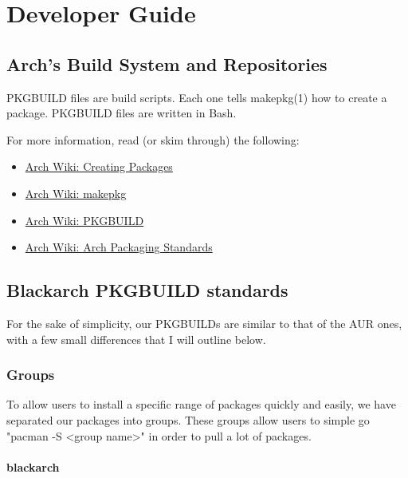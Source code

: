 \documentclass[a4paper, oneside, 11pt]{book}
\begin{document}

\chapter{Developer Guide}

\section{Arch's Build System and Repositories}

PKGBUILD files are build scripts. Each one tells makepkg(1) how to create a package. PKGBUILD files
are written in Bash.

For more information, read (or skim through) the following:
\begin{itemize}
	\item \href{https://wiki.archlinux.org/index.php/Creating_Packages}{Arch Wiki: Creating Packages}
	\item \href{https://wiki.archlinux.org/index.php/Makepkg}{Arch Wiki: makepkg}
	\item \href{https://wiki.archlinux.org/index.php/PKGBUILD}{Arch Wiki: PKGBUILD}
	\item \href{https://wiki.archlinux.org/index.php/Arch_Packaging_Standards}{Arch Wiki: Arch Packaging Standards}
\end{itemize}

\section{Blackarch PKGBUILD standards}

For the sake of simplicity, our PKGBUILDs are similar to that of the AUR ones, with a few small differences that I will outline below.

\subsection{Groups}

To allow users to install a specific range of packages quickly and easily, we have separated our packages into groups. These groups allow users to simple go "pacman -S <group name>" in order to pull a lot of packages.

\subsubsection{blackarch}
\end{document}
